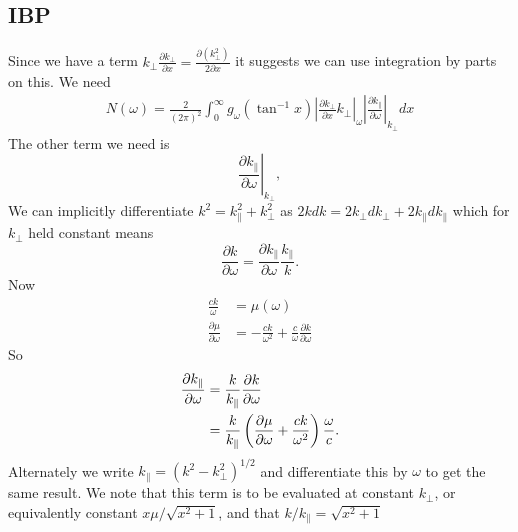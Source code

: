 \documentclass[]{article}
\begin{document}
\subsection{IBP}
Since we have a term $k_\perp  \frac{\partial k_\perp}{\partial x}= \frac{\partial (k_\perp^2)}{2 \partial x}$ it suggests we can use integration by parts on this. We need
\begin{align}
N(\omega) = \frac{2}{(2\pi)^2} \int_0^\infty g_\omega( \tan^{-1} x ) \left| \frac{\partial k_\perp}{\partial x}k_\perp\right|_\omega \left| \frac{\partial k_\parallel}{\partial \omega}\right|_{k_\perp}   d x
\end{align}
The other term we need is 
\begin{equation}\label{kpar_omega} \left.\frac{\partial k_\parallel}{\partial \omega}\right|_{k_\perp}, 
\end{equation}
We can implicitly differentiate $k^2 = k_\parallel^2 + k_\perp^2$ as $ 2 k dk = 2 k_\perp dk_\perp + 2 k_\parallel dk_\parallel$ which for $k_\perp$ held constant means
\begin{equation}
\frac{\partial k}{\partial \omega} = \frac{\partial k_\parallel}{\partial \omega} \frac{k_\parallel}{k}.
\end{equation}Now
\begin{align}
\frac{c k}{\omega} &= \mu(\omega)\\
\frac{\partial \mu}{\partial \omega} &= -\frac{ c k }{\omega^2} + \frac{c}{\omega}\frac{\partial k}{\partial \omega}
\end{align}
So
\begin{align}
\frac{\partial k_\parallel}{\partial \omega}  &=  \frac{k}{k_\parallel} \frac{\partial k}{\partial \omega}\notag\\
&= \frac{k}{k_\parallel}\left( \frac{\partial \mu}{\partial \omega} + \frac {ck}{\omega^2}\right)\frac{\omega}{c}.
\end{align}
Alternately we write $k_\parallel = (k^2 - k_\perp^2)^{1/2}$ and differentiate this by $\omega$ to get the same result. We note that this term is to be evaluated at constant $k_\perp$, or equivalently constant $ x \mu / \sqrt{x^2 +1}$, and that $k/k_\parallel = \sqrt{x^2 +1}$
\end{document}
